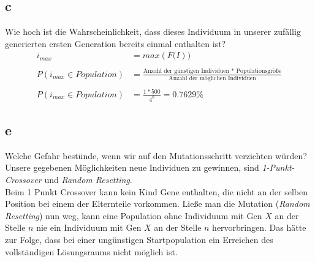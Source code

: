 \documentclass[12pt, a4paper]{article}
\begin{document}
\subsection*{c}
Wie hoch ist die Wahrscheinlichkeit, dass dieses Individuum in unserer zufällig generierten ersten Generation bereits einmal enthalten ist?\\
\begin{align*}
i_{max} &= max(F\mathbb(I)) \\\\
P(i_{max}\in Population) &= \frac{\text{Anzahl der günstigen Individuen * Populationsgröße}}{\text{Anzahl der möglichen Individuen}} \\\\
P(i_{max}\in Population) &= \frac{1*500}{4^8} = 0.7629\%
\end{align*}

\subsection*{e}
Welche Gefahr bestünde, wenn wir auf den Mutationsschritt verzichten würden?\\
Unsere gegebenen Möglichkeiten neue Individuen zu gewinnen, sind \textit{1-Punkt-Crossover} und \textit{Random Resetting}.\\
Beim 1 Punkt Crossover kann kein Kind Gene enthalten, die nicht an der selben Position bei einem der Elternteile vorkommen. Ließe man die Mutation (\textit{Random Resetting}) nun weg, kann eine Population ohne Individuum mit Gen $X$ an der Stelle $n$ nie ein Individuum mit Gen $X$ an der Stelle $n$ hervorbringen. Das hätte zur Folge, dass bei einer ungünstigen Startpopulation ein Erreichen des vollständigen Lösungsraums nicht möglich ist.
\end{document}
